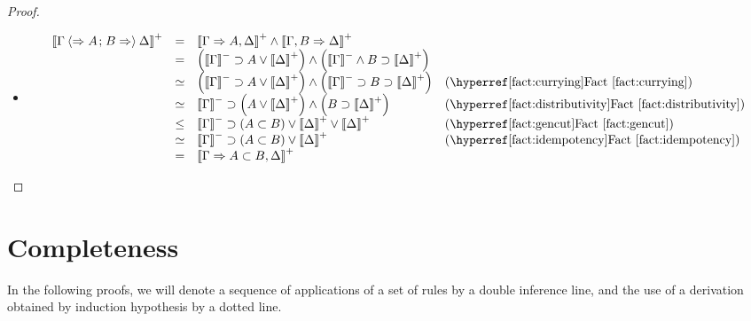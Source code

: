 \begin{proof}
\begin{itemize}
    \item[\rsf{{\lsub}{+}}]
    $$
    \begin{array}{rcll}
      \psint{\Gamma \piq{\seq A \sep B \seq} \Delta}
      &=& \psint{\Gamma \seq A, \Delta} \land \psint{\Gamma, B \seq \Delta} & \\
      &=& \left(\nsint{\Gamma} \limp A \lor \psint{\Delta} \right) \land \left(\nsint{\Gamma} \land B \limp \psint{\Delta} \right) & \\
      &\semequiv& \left(\nsint{\Gamma} \limp A \lor \psint{\Delta} \right) \land \left(\nsint{\Gamma} \limp B \limp \psint{\Delta} \right) &\text{(\reffact{currying})} \\
      &\semequiv& \nsint{\Gamma} \limp \left(A \lor \psint{\Delta} \right) \land \left(B \limp \psint{\Delta} \right) &\text{(\reffact{distributivity})} \\
      &\sement& \nsint{\Gamma} \limp (A \lsub B) \lor \psint{\Delta} \lor \psint{\Delta} &\text{(\reffact{gencut})} \\
      &\semequiv& \nsint{\Gamma} \limp (A \lsub B) \lor \psint{\Delta} &\text{(\reffact{idempotency})} \\
      &=& \psint{\Gamma \seq A \lsub B, \Delta} & \\
    \end{array}
    $$
  \end{itemize}
\end{proof}

\section{Completeness}

In the following proofs, we will denote a sequence of applications of a set of
rules by a double inference line, and the use of a derivation obtained by
induction hypothesis by a dotted line.

